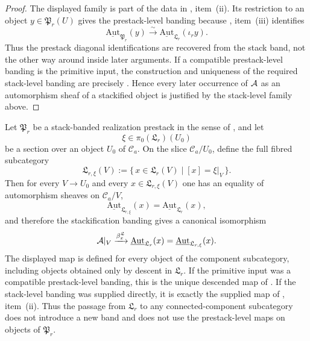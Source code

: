 \begin{proof}
The displayed family is part of the data in
, item~\textup{(ii)}. Its restriction to an object
$y\in\mathfrak P_r(U)$ gives the prestack-level banding because
, item~\textup{(iii)} identifies
\[
\underline{\mathrm{Aut}}_{\mathfrak P_r}(y)
\xrightarrow{\sim}
\underline{\mathrm{Aut}}_{\mathfrak L_r}(\iota_r y).
\]
Thus the prestack diagonal identifications are recovered from the stack band,
not the other way around inside later arguments. If a compatible
prestack-level banding is the primitive input, the construction and uniqueness
of the required stack-level banding are precisely
. Hence every later occurrence of
$\mathcal{A}$ as an automorphism sheaf of a stackified object is justified by the
stack-level family above.
\end{proof}

\begin{proposition}\label{prop:banded-stack-handoff}
Let $\mathfrak P_r$ be a stack-banded realization prestack in the sense of
, and let
\[
\xi\in\pi_0(\mathfrak L_r)(U_0)
\]
be a section over an object $U_0$ of $\mathcal C_a$. On the slice
$\mathcal C_a/U_0$, define the full fibred subcategory
\[
\mathfrak L_{r,\xi}(V)
:=
\{\,x\in\mathfrak L_r(V)\mid [x]=\xi|_V\,\}.
\]
Then for every $V\to U_0$ and every $x\in\mathfrak L_{r,\xi}(V)$ one has an
equality of automorphism sheaves on $\mathcal C_a/V$,
\[
\underline{\mathrm{Aut}}_{\mathfrak L_{r,\xi}}(x)
=
\underline{\mathrm{Aut}}_{\mathfrak L_r}(x),
\]
and therefore the stackification banding gives a canonical isomorphism
\[
\mathcal{A}|_V
\xrightarrow{\beta^{\mathfrak L}_x}
\underline{\mathrm{Aut}}_{\mathfrak L_r}(x)
=
\underline{\mathrm{Aut}}_{\mathfrak L_{r,\xi}}(x).
\]
The displayed map is defined for every object of the component subcategory,
including objects obtained only by descent in $\mathfrak L_r$. If the primitive
input was a compatible prestack-level banding, this is the unique descended map
of . If the stack-level banding was
supplied directly, it is exactly the supplied map of
, item~\textup{(ii)}. Thus the passage from
$\mathfrak L_r$ to any connected-component subcategory does not introduce a new
band and does not use the prestack-level maps on objects of $\mathfrak P_r$.
\end{proposition}

